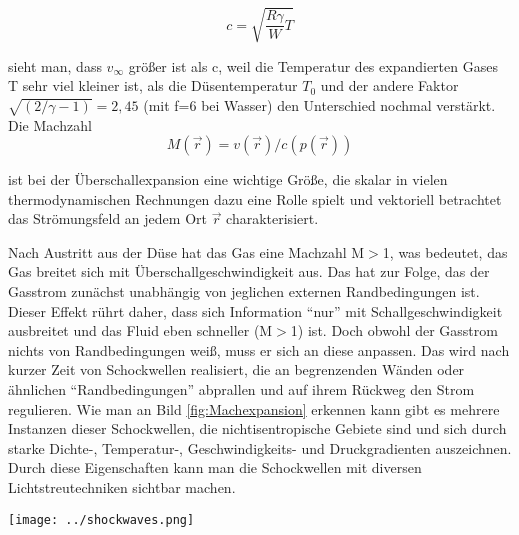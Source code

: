 \begin{equation}
c=\sqrt{\frac{R \gamma}{W}T}
\end{equation}

sieht man, dass $v_{\infty}$ größer ist als c, weil die Temperatur des expandierten Gases T sehr viel kleiner ist, als die Düsentemperatur $T_0$ und der andere Faktor $\sqrt{(2/\gamma -1)}=2,45$ (mit f=6 bei Wasser) den Unterschied nochmal verstärkt.\\
Die Machzahl 
\begin{equation}
M(\vec{r})= v(\vec{r})/c(p(\vec{r}))
\end{equation}

ist bei der Überschallexpansion eine wichtige Größe, die skalar in vielen thermodynamischen Rechnungen dazu eine Rolle spielt und vektoriell betrachtet das Strömungsfeld an jedem Ort $\vec{r}$ charakterisiert. 

Nach Austritt aus der Düse hat das Gas eine Machzahl M$>$1, was bedeutet, das Gas breitet sich mit Überschallgeschwindigkeit aus. Das hat zur Folge, das der Gasstrom zunächst unabhängig von jeglichen externen Randbedingungen ist. Dieser Effekt rührt daher, dass sich Information \enquote{nur} mit Schallgeschwindigkeit ausbreitet und das Fluid eben schneller (M$>$1) ist. Doch obwohl der Gasstrom nichts von Randbedingungen weiß, muss er sich an diese anpassen. Das wird nach kurzer Zeit von Schockwellen realisiert, die an begrenzenden Wänden oder ähnlichen \enquote{Randbedingungen} abprallen und auf ihrem Rückweg den Strom regulieren. Wie man an Bild \ref{fig:Machexpansion} erkennen kann gibt es mehrere Instanzen dieser Schockwellen, die nichtisentropische Gebiete sind und sich durch starke Dichte-, Temperatur-, Geschwindigkeits- und Druckgradienten auszeichnen. Durch diese Eigenschaften kann man die Schockwellen mit diversen Lichtstreutechniken sichtbar machen.

\begin{center}
\begin{minipage}{\linewidth}
\centering
\texttt{[image: ../shockwaves.png]}%
 \label{fig:Machexpansion}
\end{minipage} 
\end{center} 
 
